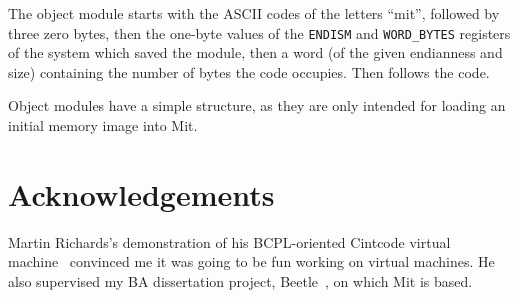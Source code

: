 \documentclass[a4paper]{article}
\begin{document}
The object module starts with the ASCII codes of the letters
``mit'', followed by three zero bytes, then the one-byte values of
the {\tt ENDISM} and {\tt WORD\_BYTES} registers of the system which saved the module, then a word (of the given endianness and size) containing the number of bytes the code occupies. Then follows the code.

Object modules have a simple structure, as they are only intended for loading an
initial memory image into Mit.


\section*{Acknowledgements}

Martin Richards's demonstration of his BCPL-oriented Cintcode virtual machine~\cite{cintweb}
convinced me it was going to be fun working on virtual machines. He also supervised my BA dissertation project, Beetle~\cite{beetledis}, on which Mit is based.



\end{document}
